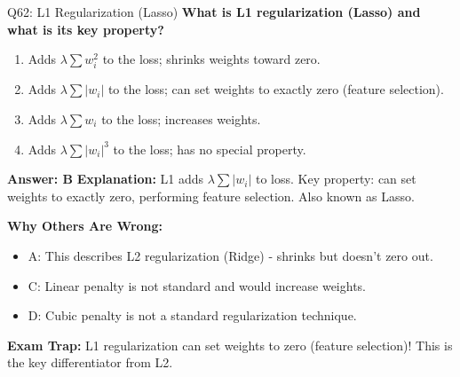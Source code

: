 \documentclass[8pt]{beamer}
\begin{document}
	\begin{frame}{Q62: L1 Regularization (Lasso)}
		\fontsize{6.5}{7.5}\selectfont
		\textbf{What is L1 regularization (Lasso) and what is its key property?}
		
		\begin{enumerate}
			\item Adds $\lambda \sum w_i^2$ to the loss; shrinks weights toward zero.
			\item Adds $\lambda \sum |w_i|$ to the loss; can set weights to exactly zero (feature selection).
			\item Adds $\lambda \sum w_i$ to the loss; increases weights.
			\item Adds $\lambda \sum |w_i|^3$ to the loss; has no special property.
		\end{enumerate}
		
		\vspace{0.05cm}
		\textcolor{myblue}{\textbf{Answer: B}}
		\vspace{0.05cm}
		\textcolor{myblue}{\textbf{Explanation:}} L1 adds $\lambda \sum |w_i|$ to loss. Key property: can set weights to exactly zero, performing feature selection. Also known as Lasso.
		
		\vspace{0.05cm}
		\textcolor{myred}{\textbf{Why Others Are Wrong:}}
		\begin{itemize}
			\item \textcolor{myred}{A:} This describes L2 regularization (Ridge) - shrinks but doesn't zero out.
			\item \textcolor{myred}{C:} Linear penalty is not standard and would increase weights.
			\item \textcolor{myred}{D:} Cubic penalty is not a standard regularization technique.
		\end{itemize}
		
		\textcolor{myred}{\textbf{Exam Trap:}} L1 regularization \textcolor{myblue}{can set weights to zero} (feature selection)! This is the key differentiator from L2.
	\end{frame}
	
\end{document}
